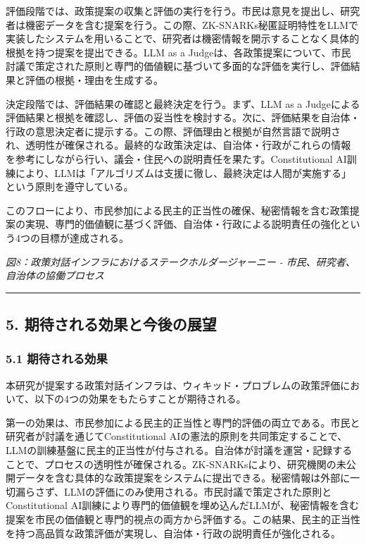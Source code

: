 評価段階では、政策提案の収集と評価の実行を行う。市民は意見を提出し、研究者は機密データを含む提案を行う。この際、ZK-SNARKs秘匿証明特性をLLMで実装したシステムを用いることで、研究者は機密情報を開示することなく具体的根拠を持つ提案を提出できる。LLM as a Judgeは、各政策提案について、市民討議で策定された原則と専門的価値観に基づいて多面的な評価を実行し、評価結果と評価の根拠・理由を生成する。

決定段階では、評価結果の確認と最終決定を行う。まず、LLM as a Judgeによる評価結果と根拠を確認し、評価の妥当性を検討する。次に、評価結果を自治体・行政の意思決定者に提示する。この際、評価理由と根拠が自然言語で説明され、透明性が確保される。最終的な政策決定は、自治体・行政がこれらの情報を参考にしながら行い、議会・住民への説明責任を果たす。Constitutional AI訓練により、LLMは「アルゴリズムは支援に徹し、最終決定は人間が実施する」という原則を遵守している。

このフローにより、市民参加による民主的正当性の確保、秘密情報を含む政策提案の実現、専門的価値観に基づく評価、自治体・行政による説明責任の強化という4つの目標が達成される。

\pandocbounded{}
\emph{図8：政策対話インフラにおけるステークホルダージャーニー - 市民、研究者、自治体の協働プロセス}

\begin{center}\rule{0.5\linewidth}{0.5pt}\end{center}

\subsection{5. 期待される効果と今後の展望}\label{ux671fux5f85ux3055ux308cux308bux52b9ux679cux3068ux4ecaux5f8cux306eux5c55ux671b}

\subsubsection{5.1 期待される効果}\label{ux671fux5f85ux3055ux308cux308bux52b9ux679c}

本研究が提案する政策対話インフラは、ウィキッド・プロブレムの政策評価において、以下の4つの効果をもたらすことが期待される。

第一の効果は、市民参加による民主的正当性と専門的評価の両立である。市民と研究者が討議を通じてConstitutional AIの憲法的原則を共同策定することで、LLMの訓練基盤に民主的正当性が付与される。自治体が討議を運営・記録することで、プロセスの透明性が確保される。ZK-SNARKsにより、研究機関の未公開データを含む具体的な政策提案をシステムに提出できる。秘密情報は外部に一切漏らさず、LLMの評価にのみ使用される。市民討議で策定された原則とConstitutional AI訓練により専門的価値観を埋め込んだLLMが、秘密情報を含む提案を市民の価値観と専門的視点の両方から評価する。この結果、民主的正当性を持つ高品質な政策評価が実現し、自治体・行政の説明責任が強化される。

